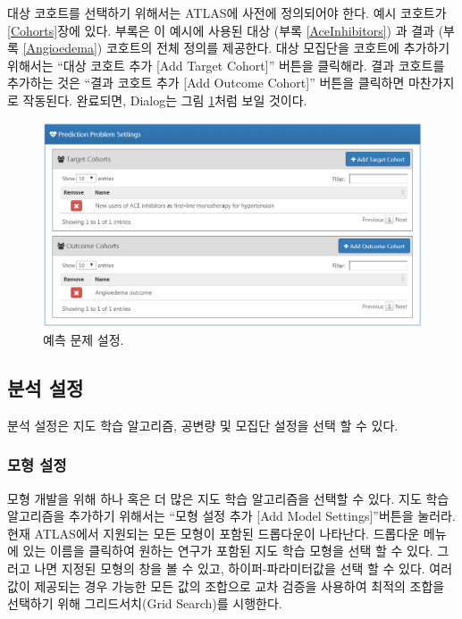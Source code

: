 \documentclass[11pt]{book}
\theoremstyle{definition}
\theoremstyle{definition}
\theoremstyle{definition}
\theoremstyle{remark}
\begin{document}
대상 코호트를 선택하기 위해서는 ATLAS에 사전에 정의되어야 한다. 예시
코호트가 \ref{Cohorts}장에 있다. 부록은 이 예시에 사용된 대상 (부록
\ref{AceInhibitors}) 과 결과 (부록 \ref{Angioedema}) 코호트의 전체
정의를 제공한다. 대상 모집단을 코호트에 추가하기 위해서는 ``대상 코호트
추가 {[}Add Target Cohort{]}'' 버튼을 클릭해라. 결과 코호트를 추가하는
것은 ``결과 코호트 추가 {[}Add Outcome Cohort{]}'' 버튼을 클릭하면
마찬가지로 작동된다. 완료되면, Dialog는 그림
\ref{fig:problemSettings}처럼 보일 것이다.

\begin{figure}

{\centering \includegraphics[width=1\linewidth]{images/PatientLevelPrediction/problemSettings} 

}

\caption{예측 문제 설정.}\label{fig:problemSettings}
\end{figure}

\subsection{분석 설정}\label{-}

분석 설정은 지도 학습 알고리즘, 공변량 및 모집단 설정을 선택 할 수 있다.

\subsubsection*{모형 설정}\label{-}

모형 개발을 위해 하나 혹은 더 많은 지도 학습 알고리즘을 선택할 수 있다.
지도 학습 알고리즘을 추가하기 위해서는 ``모형 설정 추가 {[}Add Model
Settings{]}''버튼을 눌러라. 현재 ATLAS에서 지원되는 모든 모형이 포함된
드롭다운이 나타난다. 드롭다운 메뉴에 있는 이름을 클릭하여 원하는 연구가
포함된 지도 학습 모형을 선택 할 수 있다. 그러고 나면 지정된 모형의 창을
볼 수 있고, 하이퍼-파라미터값을 선택 할 수 있다. 여러 값이 제공되는 경우
가능한 모든 값의 조합으로 교차 검증을 사용하여 최적의 조합을 선택하기
위해 그리드서치(Grid Search)를 시행한다.
\end{document}
